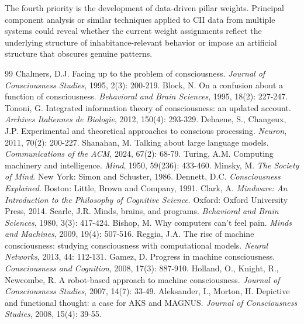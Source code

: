\documentclass[11pt,a4paper]{article}
\begin{document}
The fourth priority is the development of data-driven pillar weights. Principal component analysis or similar techniques applied to CII data from multiple systems could reveal whether the current weight assignments reflect the underlying structure of inhabitance-relevant behavior or impose an artificial structure that obscures genuine patterns.

\begin{thebibliography}{99}
 Chalmers, D.J. Facing up to the problem of consciousness. \textit{Journal of Consciousness Studies}, 1995, 2(3): 200-219.
 Block, N. On a confusion about a function of consciousness. \textit{Behavioral and Brain Sciences}, 1995, 18(2): 227-247.
 Tononi, G. Integrated information theory of consciousness: an updated account. \textit{Archives Italiennes de Biologie}, 2012, 150(4): 293-329.
 Dehaene, S., Changeux, J.P. Experimental and theoretical approaches to conscious processing. \textit{Neuron}, 2011, 70(2): 200-227.
 Shanahan, M. Talking about large language models. \textit{Communications of the ACM}, 2024, 67(2): 68-79.
 Turing, A.M. Computing machinery and intelligence. \textit{Mind}, 1950, 59(236): 433-460.
 Minsky, M. \textit{The Society of Mind}. New York: Simon and Schuster, 1986.
 Dennett, D.C. \textit{Consciousness Explained}. Boston: Little, Brown and Company, 1991.
 Clark, A. \textit{Mindware: An Introduction to the Philosophy of Cognitive Science}. Oxford: Oxford University Press, 2014.
 Searle, J.R. Minds, brains, and programs. \textit{Behavioral and Brain Sciences}, 1980, 3(3): 417-424.
 Bishop, M. Why computers can't feel pain. \textit{Minds and Machines}, 2009, 19(4): 507-516.
 Reggia, J.A. The rise of machine consciousness: studying consciousness with computational models. \textit{Neural Networks}, 2013, 44: 112-131.
 Gamez, D. Progress in machine consciousness. \textit{Consciousness and Cognition}, 2008, 17(3): 887-910.
 Holland, O., Knight, R., Newcombe, R. A robot-based approach to machine consciousness. \textit{Journal of Consciousness Studies}, 2007, 14(7): 33-49.
 Aleksander, I., Morton, H. Depictive and functional thought: a case for AKS and MAGNUS. \textit{Journal of Consciousness Studies}, 2008, 15(4): 39-55.
\end{thebibliography}
\end{document}
